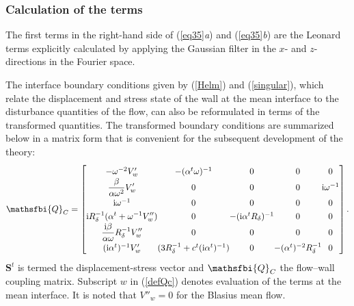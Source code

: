 \documentclass{jfm}
\newcommand\biS{\boldsymbol{S}}
\newcommand\slsQ{\mathsfbi{Q}} %
\begin{document}
\subsubsection{Calculation of the terms}

The first terms in the right-hand side of (\ref{eq35}\textit{a}) and
(\ref{eq35}\textit{b}) are the Leonard terms explicitly calculated by
applying the Gaussian filter in the $x$- and $z$-directions in the
Fourier space.

The interface boundary conditions given by (\ref{Helm}) and (\ref{singular}),
which relate the displacement and stress state of the wall at the mean
interface to the disturbance quantities of the flow, can also be reformulated
in terms of the transformed quantities.  The transformed boundary conditions
are summarized below in a matrix form that is convenient for the subsequent
development of the theory:
%
%
\begin{equation}
\setlength{\arraycolsep}{0pt}
\renewcommand{\arraystretch}{1.3}
\slsQ_C = \left[
\begin{array}{ccccc}
  -\omega^{-2}V'_w  &  -(\alpha^t\omega)^{-1}  &  0  &  0  &  0  \\
  \displaystyle
  \frac{\beta}{\alpha\omega^2}V'_w  &  0  &  0  &  0  &  \mathrm{i}\omega^{-1} \\
  \mathrm{i}\omega^{-1}  &  0  &  0  &  0  &  0  \\
  \displaystyle
  \mathrm{i} R^{-1}_{\delta}(\alpha^t+\omega^{-1}V''_w)  &  0
    & -(\mathrm{i}\alpha^tR_\delta)^{-1}  &  0  &  0  \\
  \displaystyle
  \frac{\mathrm{i}\beta}{\alpha\omega}R^{-1}_\delta V''_w  &  0  &  0
    &  0  & 0 \\
  (\mathrm{i}\alpha^t)^{-1}V'_w  &  (3R^{-1}_{\delta}+c^t(\mathrm{i}\alpha^t)^{-1})
    &  0  &  -(\alpha^t)^{-2}R^{-1}_{\delta}  &  0  \\
\end{array}  \right] .
\label{defQc}
\end{equation}
$\biS^t$ is termed the displacement-stress vector and $\slsQ_C$
the flow--wall coupling matrix.  Subscript $w$ in (\ref{defQc}) denotes
evaluation of the terms at the mean interface.  It is noted that $V''_w = 0$
for the Blasius mean flow.
\end{document}
